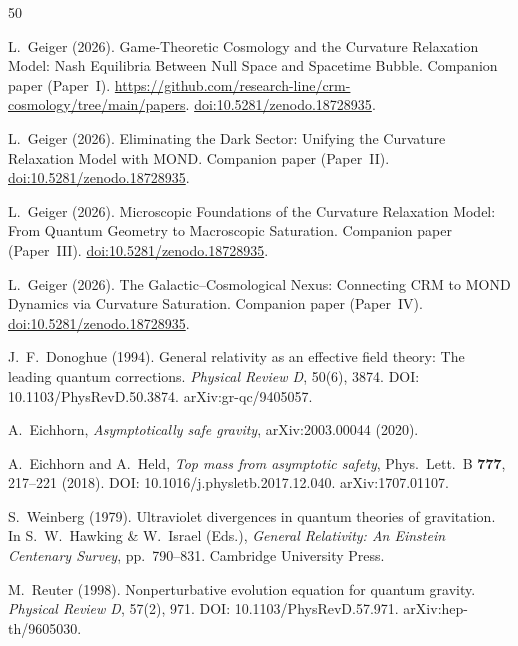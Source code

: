 \documentclass[aps,prd,twocolumn,superscriptaddress,nofootinbib]{revtex4-2}
\begin{document}
\begin{thebibliography}{50}

L.~Geiger (2026).
Game-Theoretic Cosmology and the Curvature Relaxation Model: Nash Equilibria Between Null Space and Spacetime Bubble.
Companion paper (Paper~I).
\url{https://github.com/research-line/crm-cosmology/tree/main/papers}.
\href{https://doi.org/10.5281/zenodo.18728935}{doi:10.5281/zenodo.18728935}.

L.~Geiger (2026).
Eliminating the Dark Sector: Unifying the Curvature Relaxation Model with MOND.
Companion paper (Paper~II).
\href{https://doi.org/10.5281/zenodo.18728935}{doi:10.5281/zenodo.18728935}.

L.~Geiger (2026).
Microscopic Foundations of the Curvature Relaxation Model: From Quantum Geometry to Macroscopic Saturation.
Companion paper (Paper~III).
\href{https://doi.org/10.5281/zenodo.18728935}{doi:10.5281/zenodo.18728935}.

L.~Geiger (2026).
The Galactic--Cosmological Nexus: Connecting CRM to MOND Dynamics via Curvature Saturation.
Companion paper (Paper~IV).
\href{https://doi.org/10.5281/zenodo.18728935}{doi:10.5281/zenodo.18728935}.

J.~F.~Donoghue (1994).
General relativity as an effective field theory: The leading quantum corrections.
\textit{Physical Review D}, 50(6), 3874.
DOI: 10.1103/PhysRevD.50.3874.
arXiv:gr-qc/9405057.

A.~Eichhorn,
\textit{Asymptotically safe gravity},
arXiv:2003.00044 (2020).

A.~Eichhorn and A.~Held,
\textit{Top mass from asymptotic safety},
Phys.\ Lett.\ B \textbf{777}, 217--221 (2018).
DOI: 10.1016/j.physletb.2017.12.040.
arXiv:1707.01107.

S.~Weinberg (1979).
Ultraviolet divergences in quantum theories of gravitation.
In S.~W.~Hawking \& W.~Israel (Eds.), \textit{General Relativity: An Einstein Centenary Survey}, pp.\ 790--831.
Cambridge University Press.

M.~Reuter (1998).
Nonperturbative evolution equation for quantum gravity.
\textit{Physical Review D}, 57(2), 971.
DOI: 10.1103/PhysRevD.57.971.
arXiv:hep-th/9605030.


\end{thebibliography}
\end{document}

